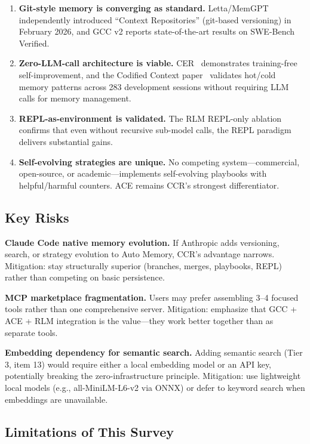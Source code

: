 \documentclass[11pt]{article}
\begin{document}
\begin{enumerate}[leftmargin=*]
    \item \textbf{Git-style memory is converging as standard.} Letta/MemGPT independently introduced ``Context Repositories'' (git-based versioning) in February 2026, and GCC v2 reports state-of-the-art results on SWE-Bench Verified.
    \item \textbf{Zero-LLM-call architecture is viable.} CER~\cite{cer} demonstrates training-free self-improvement, and the Codified Context paper~\cite{codified_context} validates hot/cold memory patterns across 283 development sessions without requiring LLM calls for memory management.
    \item \textbf{REPL-as-environment is validated.} The RLM REPL-only ablation~\cite{rlm} confirms that even without recursive sub-model calls, the REPL paradigm delivers substantial gains.
    \item \textbf{Self-evolving strategies are unique.} No competing system---commercial, open-source, or academic---implements self-evolving playbooks with helpful/harmful counters. ACE remains CCR's strongest differentiator.
\end{enumerate}

\subsection{Key Risks}

\textbf{Claude Code native memory evolution.} If Anthropic adds versioning, search, or strategy evolution to Auto Memory, CCR's advantage narrows. Mitigation: stay structurally superior (branches, merges, playbooks, REPL) rather than competing on basic persistence.

\textbf{MCP marketplace fragmentation.} Users may prefer assembling 3--4 focused tools rather than one comprehensive server. Mitigation: emphasize that GCC + ACE + RLM integration is the value---they work better together than as separate tools.

\textbf{Embedding dependency for semantic search.} Adding semantic search (Tier 3, item 13) would require either a local embedding model or an API key, potentially breaking the zero-infrastructure principle. Mitigation: use lightweight local models (e.g., all-MiniLM-L6-v2 via ONNX) or defer to keyword search when embeddings are unavailable.

\subsection{Limitations of This Survey}
\end{document}
